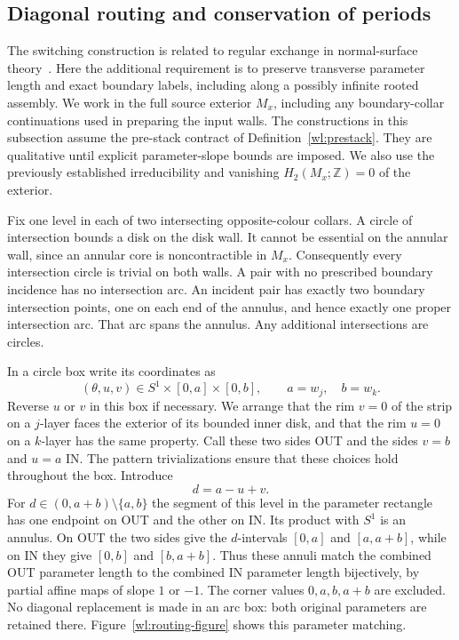 \documentclass[11pt]{article}
\numberwithin{equation}{section}
\theoremstyle{definition}
\theoremstyle{remark}
\begin{document}
\subsection{Diagonal routing and conservation of periods}
\label{wl:routing-subsection}

The switching construction is related to regular exchange in
normal-surface theory~\cite{Haken1961}.  Here the additional requirement
is to preserve transverse parameter length and exact boundary labels,
including along a possibly infinite rooted assembly.
We work in the full source exterior $M_x$, including any boundary-collar
continuations used in preparing the input walls.  The constructions in
this subsection
assume the pre-stack contract of Definition~\ref{wl:prestack}.  They are
qualitative until explicit parameter-slope bounds are imposed.  We also use
the previously established irreducibility and vanishing
$H_2(M_x;\mathbb Z)=0$ of the exterior.

Fix one level in each of two intersecting opposite-colour collars.  A circle
of intersection bounds a disk on the disk wall.  It cannot be essential on
the annular wall, since an annular core is noncontractible in $M_x$.
Consequently every intersection circle is trivial on both walls.  A pair
with no prescribed boundary incidence has no intersection arc.  An incident
pair has exactly two boundary intersection points, one on each end of the
annulus, and hence exactly one proper intersection arc.  That arc spans the
annulus.  Any additional intersections are circles.

In a circle box write its coordinates as
\[
                (\theta,u,v)\in S^1\times[0,a]\times[0,b],
                \qquad a=w_j,\quad b=w_k.
\]
Reverse $u$ or $v$ in this box if necessary.  We arrange that the rim $v=0$
of the strip on a $j$-layer faces the exterior of its bounded inner disk,
and that the rim $u=0$ on a $k$-layer has the same property.  Call these two
sides OUT and the sides $v=b$ and $u=a$ IN.  The pattern trivializations
ensure that these choices hold throughout the box.  Introduce
\begin{equation}
\label{wl:diagonal-coordinate}
                              d=a-u+v.
\end{equation}
For $d\in(0,a+b)\setminus\{a,b\}$ the segment of this level in the parameter
rectangle has one endpoint on OUT and the other on IN.  Its product with
$S^1$ is an annulus.  On OUT the two sides give the $d$-intervals $[0,a]$
and $[a,a+b]$, while on IN they give $[0,b]$ and $[b,a+b]$.
Thus these annuli match the combined OUT parameter length to the combined
IN parameter length bijectively, by partial affine maps of slope $1$ or
$-1$.  The corner values $0,a,b,a+b$ are excluded.  No diagonal replacement
is made in an arc box: both original parameters are retained there.
Figure~\ref{wl:routing-figure} shows this parameter matching.
\end{document}

